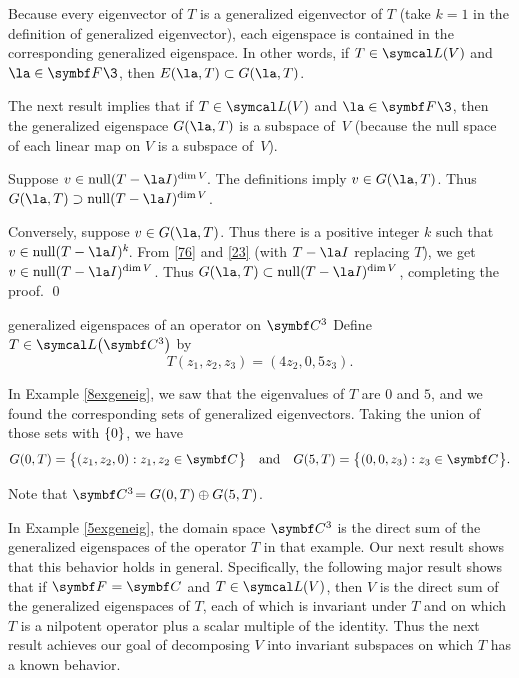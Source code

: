 Because every eigenvector of $T$ is a generalized eigenvector of $T$ (take $k=1$ in the definition of generalized eigenvector), each eigenspace is contained in the corresponding generalized eigenspace. In other words, if $T \in \L(V)$ and $\la \in \F{}\3$, then
$
E(\la, T) \subset G(\la, T)$.

The next result implies that if $T \in \L(V)$ and $\la \in \F{}\3$, then the generalized eigenspace $G(\la, T)$ is a subspace of\/~$V$ (because the null space of each linear map on $V$ is a subspace of~$V$).


\proof
Suppose $v \in \ker (T - \la I)^{\dim V}\!$. The definitions imply $v \in G(\la, T)$. Thus $G(\la, T) \supset \ker (T - \la I)^{\dim V}$\!.

Conversely, suppose $v \in G(\la, T)$.  Thus there is a positive integer $k$ such that
$
v \in
\ker (T - \la I)^k\!$.
From \ref{76} and \ref{23} (with $T - \la I$ replacing $T$), we get
$v \in \ker (T - \la I)^{\dim V}$\!. Thus $G(\la, T) \subset \ker (T - \la I)^{\dim V}$\!, completing the proof.
\qed

\begin{example}[5exgeneig]{generalized eigenspaces of an operator on\/ $\C3$}
Define $T \in \L\paren[\big]{\C{3}}$ by
\[
T(z_1, z_2, z_3) = (4z_2, 0, 5z_3).
\]

In Example \ref{8exgeneig}, we saw that the eigenvalues of $T$ are $0$ and $5$, and we found the corresponding sets of generalized eigenvectors. Taking the union of those sets with $\{0\}$, we have
\[
G(0, T) = \br[\big]{ (z_1, z_2, 0): z_1, z_2 \in \C{} } \andd G(5, T) = \br[\big]{ (0, 0, z_3): z_3 \in \C{} }.
\]

Note that $\CC{3} = G(0, T)\oplus G(5, T)$.
\end{example}

In Example \ref{5exgeneig}, the domain space $\C3$ is the direct sum of the generalized eigenspaces of the operator $T$ in that example. Our next result shows that this behavior holds in general. Specifically, the following major result shows that if
$\F{} = \C{}$ and $T \in \L(V)$, then $V$ is the direct sum of the generalized eigenspaces of $T$, each of which is invariant under $T$ and on which $T$ is a nilpotent operator plus a scalar multiple of the identity. Thus the next result  achieves our goal of decomposing $V$ into invariant subspaces on which $T$ has a known behavior.


